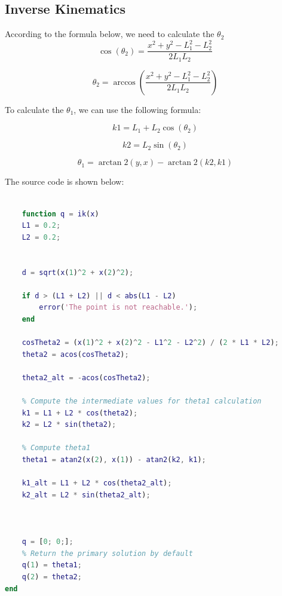 \documentclass{article}
\begin{document}
\subsection*{Inverse Kinematics}
According to the formula below, we need to calculate the $\theta_2 $\\
\begin{equation}
    \cos \left(\theta_2\right)=\frac{x^2+y^2-L_1^2-L_2^2}{2 L_1 L_2} 
\end{equation}

\begin{equation}
    \theta_2=\arccos \left(\frac{x^2+y^2-L_1^2-L_2^2}{2 L_1 L_2}\right)
\end{equation}

To calculate the $\theta_1$, we can use the following formula:


\begin{equation}
    k 1=L_1+L_2 \cos \left(\theta_2\right) 
\end{equation}

\begin{equation}
    k 2=L_2 \sin \left(\theta_2\right) 
\end{equation}

\begin{equation}
    \theta_1=\arctan 2(y, x)-\arctan 2(k 2, k 1)
\end{equation}
    
The source code is shown below:
\begin{lstlisting}[language=Matlab, basicstyle=\small\ttfamily]

    function q = ik(x)
    L1 = 0.2;
    L2 = 0.2;


    d = sqrt(x(1)^2 + x(2)^2);
    
    if d > (L1 + L2) || d < abs(L1 - L2)
        error('The point is not reachable.');
    end
    
    cosTheta2 = (x(1)^2 + x(2)^2 - L1^2 - L2^2) / (2 * L1 * L2);
    theta2 = acos(cosTheta2);
    
    theta2_alt = -acos(cosTheta2);
    
    % Compute the intermediate values for theta1 calculation
    k1 = L1 + L2 * cos(theta2);
    k2 = L2 * sin(theta2);
    
    % Compute theta1
    theta1 = atan2(x(2), x(1)) - atan2(k2, k1);    
    
    k1_alt = L1 + L2 * cos(theta2_alt);
    k2_alt = L2 * sin(theta2_alt);
    


    q = [0; 0;];
    % Return the primary solution by default
    q(1) = theta1;
    q(2) = theta2;
end

    
\end{lstlisting}
\end{document}
